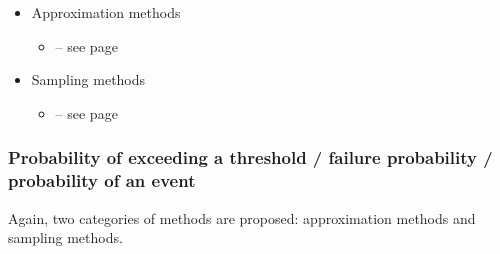 \begin{itemize}

\item Approximation methods
\begin{itemize}
\item {}  -- see page \pageref{docref_C211_QuadraticCumul} \vspace{2mm}
\end{itemize}

\item Sampling methods
\begin{itemize}
\item {}  -- see page \pageref{docref_C221_MonteCarloStd} \vspace{2mm}
\end{itemize}

\end{itemize}

\subsubsection{Probability of exceeding a threshold / failure probability / probability of an event}

Again, two categories of methods are proposed: approximation methods and sampling methods.


